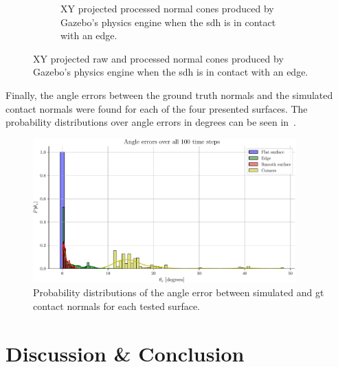 \begin{figure}[!h]
\begin{subfigure}[b]{0.48\textwidth}
		\caption{XY projected processed normal cones produced by Gazebo's physics engine when the \gls{sdh} is in contact with an edge.}
		\label{fig:xy-projected-processed-normal-cones}
	\end{subfigure}
		\caption{XY projected raw and processed normal cones produced by Gazebo's physics engine when the \gls{sdh} is in contact with an edge.}
		\label{fig:xy-projected-processed-normal-normal-cones}
\end{figure}

Finally, the angle errors  between the ground truth normals  and the simulated contact normals were found for each of the four presented surfaces. The probability distributions over angle errors  in degrees can be seen in~.

\begin{figure}[!h]
	\begin{center}
		\includegraphics[width=0.9\textwidth]{chapters/1-tactile-perception/fig/matplotlib/histogram-normal-errors.pdf}
	\end{center}
	\caption{Probability distributions  of the angle error  between simulated and \gls{gt} contact normals for each tested surface.}
	\label{fig:histogram-normal-errors}
\end{figure}

\newpage
\section{Discussion \& Conclusion}\label{sec:1-tactile-perception-discussion-and-conclusion}



